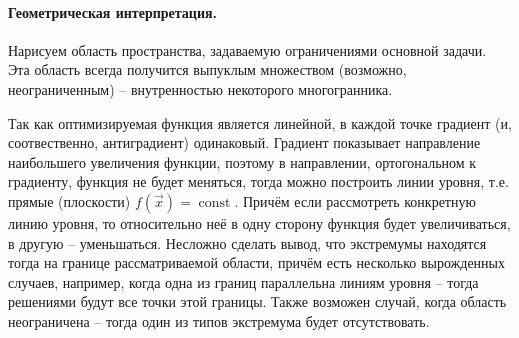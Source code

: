 \paragraph{Геометрическая интерпретация.}
Нарисуем область пространства, задаваемую ограничениями основной задачи. Эта область всегда
получится выпуклым множеством (возможно, неограниченным) -- внутренностью некоторого
многогранника.

Так как оптимизируемая функция является линейной, в каждой точке градиент (и, соотвественно,
антиградиент) одинаковый. Градиент показывает направление наибольшего увеличения функции, поэтому
в направлении, ортогональном к градиенту, функция не будет меняться, тогда можно построить
линии уровня, т.е. прямые (плоскости) $f(\vec{x}) = \operatorname{const}$.
Причём если рассмотреть конкретную линию уровня, то относительно неё в одну сторону функция будет
увеличиваться, в другую -- уменьшаться. Несложно сделать вывод, что экстремумы находятся тогда 
на границе рассматриваемой области, причём есть несколько вырожденных случаев, например, когда
одна из границ параллельна линиям уровня -- тогда решениями будут все точки этой границы.
Также возможен случай, когда область неограничена -- тогда один из типов экстремума будет
отсутствовать.

